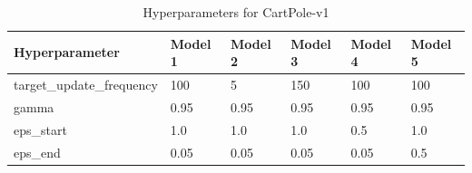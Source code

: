 \documentclass[a4paper,10pt]{article}
\begin{document}
\begin{table}[ht]
\centering
\begin{tabular}{|l|l|l|l|l|l|}
\hline
\textbf{Hyperparameter} & \textbf{Model 1} & \textbf{Model 2} & \textbf{Model 3} & \textbf{Model 4} & \textbf{Model 5} \\
\hline
target\_update\_frequency & 100 & 5 & 150 & 100 & 100 \\
gamma & 0.95 & 0.95 & 0.95 & 0.95 & 0.95 \\

eps\_start & 1.0 & 1.0 & 1.0 & 0.5 & 1.0 \\
eps\_end & 0.05 & 0.05 & 0.05 & 0.05 & 0.5 \\
\hline
\end{tabular}
\caption{Hyperparameters for CartPole-v1}
\label{tab:cartpole2}
\end{table}
\end{document}

